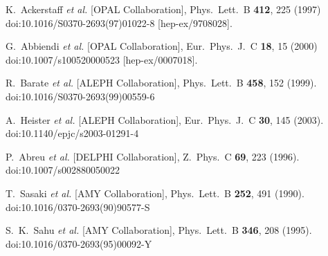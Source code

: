 \documentclass[a4paper,11pt,notoc]{article}
\begin{document}
\begin{thebibliography}{1}
	
	K.~Ackerstaff {\it et al.} [OPAL Collaboration],
	Phys.\ Lett.\ B {\bf 412}, 225 (1997)
	doi:10.1016/S0370-2693(97)01022-8
	[hep-ex/9708028].
	
	
	G.~Abbiendi {\it et al.} [OPAL Collaboration],
	Eur.\ Phys.\ J.\ C {\bf 18}, 15 (2000)
	doi:10.1007/s100520000523
	[hep-ex/0007018].
	
	R.~Barate {\it et al.} [ALEPH Collaboration],
	Phys.\ Lett.\ B {\bf 458}, 152 (1999).
	doi:10.1016/S0370-2693(99)00559-6
	
	
	A.~Heister {\it et al.} [ALEPH Collaboration],
	Eur.\ Phys.\ J.\ C {\bf 30}, 145 (2003).
	doi:10.1140/epjc/s2003-01291-4
	
	P.~Abreu {\it et al.} [DELPHI Collaboration],
	Z.\ Phys.\ C {\bf 69}, 223 (1996).
	doi:10.1007/s002880050022
	
	T.~Sasaki {\it et al.} [AMY Collaboration],
	Phys.\ Lett.\ B {\bf 252}, 491 (1990).
	doi:10.1016/0370-2693(90)90577-S
	
	S.~K.~Sahu {\it et al.} [AMY Collaboration],
	Phys.\ Lett.\ B {\bf 346}, 208 (1995).
	doi:10.1016/0370-2693(95)00092-Y
	

\end{thebibliography}
\end{document}
